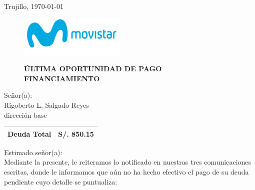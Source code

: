 %
%

\begin{flushright}
    Trujillo, \today
\end{flushright}
\vspace{-0.5cm}

\begin{figure}[h]
\begin{minipage}[b]{5.106458333cm}
\includegraphics[natwidth=5.106458333cm, natheight=1.931458333cm]{resources/business_logo.png}
\end{minipage}
\begin{minipage}[b][1.9314cm][t]{11cm}
\begin{flushright}
{\LARGE \bf ÚLTIMA OPORTUNIDAD DE PAGO\\FINANCIAMIENTO}
\end{flushright}
\end{minipage}
\end{figure}

\noindent
Señor(a):\\
Rigoberto L. Salgado Reyes\\
dirección base

\begin{flushright}
\bf \large
\begin{tabular}{|p{3.2cm} p{3.2cm}|}
\hline
Deuda Total & S/. 850.15 \\
\hline
\end{tabular}
\end{flushright}

\noindent
Estimado señor(a):\\
Mediante la presente, le reiteramos lo notificado en nuestras tres comunicaciones escritas, donde le informamos que aún no ha hecho efectivo el pago de su deuda pendiente cuyo detalle se puntualiza:

